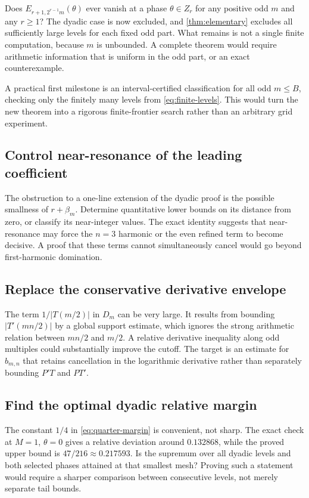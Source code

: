 \documentclass[11pt,a4paper]{article}
\numberwithin{equation}{section}
\theoremstyle{plain}
\theoremstyle{definition}
\theoremstyle{remark}
\begin{document}
Does $E_{r+1,2^{r-1}m}(\theta)$ ever vanish at a phase $\theta\in Z_r$
for any positive odd $m$ and any $r\ge1$? The dyadic case is now excluded,
and \cref{thm:elementary} excludes all sufficiently large levels for each
fixed odd part. What remains is not a single finite computation, because
$m$ is unbounded. A complete theorem would require arithmetic information
that is uniform in the odd part, or an exact counterexample.

A practical first milestone is an interval-certified classification for
all odd $m\le B$, checking only the finitely many levels from
\eqref{eq:finite-levels}. This would turn the new theorem into a rigorous
finite-frontier search rather than an arbitrary grid experiment.

\subsection{Control near-resonance of the leading coefficient}

The obstruction to a one-line extension of the dyadic proof is the
possible smallness of $r+\beta_m$. Determine quantitative lower bounds on
its distance from zero, or classify its near-integer values. The exact
identity suggests that near-resonance may force the $n=3$ harmonic or the
even refined term to become decisive. A proof that these terms cannot
simultaneously cancel would go beyond first-harmonic domination.

\subsection{Replace the conservative derivative envelope}

The term $1/|T(m/2)|$ in $D_m$ can be very large. It results from bounding
$|T'(mn/2)|$ by a global support estimate, which ignores the strong
arithmetic relation between $mn/2$ and $m/2$. A relative derivative
inequality along odd multiples could substantially improve the cutoff.
The target is an estimate for $b_{m,n}$ that retains cancellation in the
logarithmic derivative rather than separately bounding $P'T$ and $PT'$.

\subsection{Find the optimal dyadic relative margin}

The constant $1/4$ in \eqref{eq:quarter-margin} is convenient, not sharp.
The exact check at $M=1$, $\theta=0$ gives a relative deviation around
$0.132868$, while the proved upper bound is $47/216\approx0.217593$.
Is the supremum over all dyadic levels and both selected phases attained
at that smallest mesh? Proving such a statement would require a sharper
comparison between consecutive levels, not merely separate tail bounds.
\end{document}
